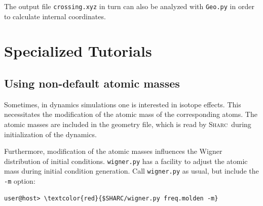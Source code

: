 \documentclass[a4paper,11pt,DIV=15,openany]{scrbook}
\newcommand{\sharc}{\textsc{Sharc}}
\newcommand{\ttt}[1]{\texttt{#1}}
\begin{document}
\normalsize
The output file \ttt{crossing.xyz} in turn can also be analyzed with \ttt{Geo.py} in order to calculate internal coordinates. 







\chapter{Specialized Tutorials}

\section{Using non-default atomic masses}

Sometimes, in dynamics simulations one is interested in isotope effects. This necessitates the modification of the atomic mass of the corresponding atoms. The atomic masses are included in the geometry file, which is read by \sharc\ during initialization of the dynamics.

Furthermore, modification of the atomic masses influences the Wigner distribution of initial conditions. \ttt{wigner.py} has a facility to adjust the atomic mass during initial condition generation. Call \ttt{wigner.py} as usual, but include the \ttt{-m} option:
\begin{Verbatim}[commandchars=\\\{\}]
user@host> \textcolor{red}{$SHARC/wigner.py freq.molden -m}
\end{Verbatim}
\end{document}
